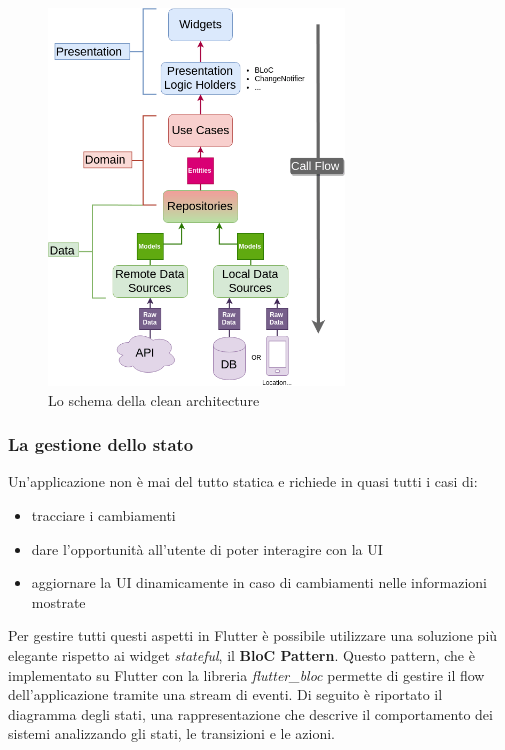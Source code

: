\documentclass[12pt]{article}
\begin{document}
\begin{center}
\begin{figure}[htp]
    \centering
    \includegraphics[height=10cm]{diagrams/clean_architecture.png}
    \caption{Lo schema della clean architecture}
    \label{fig:clean_architecture}
\end{figure}
\end{center}

\subsubsection{La gestione dello stato}
Un’applicazione non è mai del tutto statica e richiede in quasi tutti i casi di:
\begin{itemize}
	\item tracciare i cambiamenti
	\item dare l’opportunità all’utente di poter interagire con la UI
	\item aggiornare la UI dinamicamente in caso di cambiamenti nelle informazioni mostrate
\end{itemize}
Per gestire tutti questi aspetti in Flutter è possibile utilizzare una soluzione più elegante rispetto ai widget \emph{stateful}, il \textbf{BloC Pattern}. Questo pattern, che è implementato su Flutter con la libreria \emph{flutter\_bloc} permette di gestire il flow dell'applicazione tramite una stream di eventi.\clearpage
Di seguito è riportato il diagramma degli stati, una rappresentazione che descrive il comportamento dei sistemi analizzando gli stati, le transizioni e le azioni.
\end{document}

